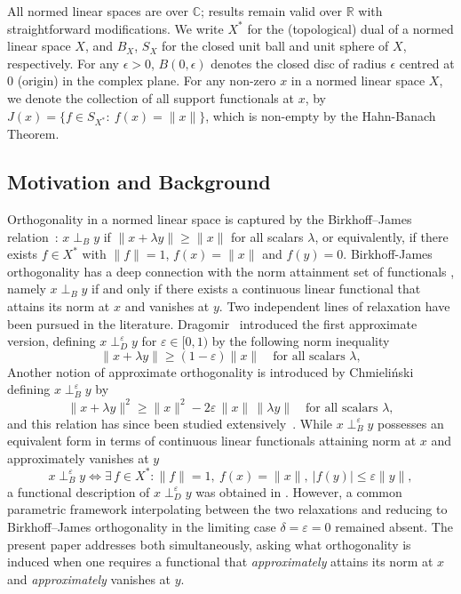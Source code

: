 \documentclass[11pt, reqno]{amsart}
\theoremstyle{definition}
\begin{document}
\noindent All normed linear spaces are over $\mathbb{C}$; results remain valid over 
$\mathbb{R}$ with straightforward modifications. We write $X^*$ for the (topological) dual of a normed linear space $X$, and $B_X$, $S_X$ for the closed unit ball and unit sphere of $X$, respectively. For any $\epsilon > 0$, $B(0, \epsilon)$ denotes the closed disc of radius $\epsilon$ centred at $0$ (origin) in the complex plane. For any non-zero $x$ in a normed linear space $X$, we denote the collection of all support functionals at $x$, by $J(x)=\{f\in S_{X^*}:~f(x)=\|x\|\}$, which is non-empty by the Hahn-Banach Theorem.

\subsection{Motivation and Background}

\noindent Orthogonality in a normed linear space is captured by the Birkhoff--James 
relation~\cite{Bir}: $x \perp_B y$ if $\|x + \lambda y\| \geq \|x\|$ 
for all scalars $\lambda$, or equivalently, if there exists $f \in X^*$ with 
$\|f\| = 1$, $f(x) = \|x\|$ and $f(y) = 0$. Birkhoff-James orthogonality has a deep connection with the norm attainment set of functionals \cite{Jam1, Jam2, roy}, namely $x\perp_B y$ if and only if there exists a continuous linear functional that attains 
its norm at $x$ and vanishes at $y$. Two independent lines of 
relaxation have been pursued in the literature. Dragomir~\cite{Drag} introduced 
the first approximate version, defining $x \perp^{\varepsilon}_{D} y$ for 
$\varepsilon \in [0,1)$ by the following norm inequality
\[
\|x + \lambda y\| \geq (1-\varepsilon)\|x\| \quad \text{for all scalars } \lambda,
\]
Another notion of approximate orthogonality is introduced by Chmieli\'nski~\cite{Chm1} defining $x \perp_B^\varepsilon y$ by
\[
\|x + \lambda y\|^2 \geq \|x\|^2 - 2\varepsilon\,\|x\|\,\|\lambda y\| 
\quad \text{for all scalars } \lambda,
\]
and this relation has since been studied 
extensively~\cite{Chm2, Chm3, Chm4, ChmGrWoj, ChmStWoj, ChmWoj, woj, Woj1, Pal, Alt}. 
While $x \perp_B^\varepsilon y$ possesses an equivalent form in terms of continuous linear functionals attaining norm at $x$ and approximately vanishes at $y$ \cite{ChmStWoj, woj} 
\[
x \perp_B^\varepsilon y \iff \exists\, f \in X^* : \|f\| = 1,\ 
f(x) = \|x\|,\ |f(y)| \leq \varepsilon\|y\|,
\]
a functional description of $x \perp^{\varepsilon}_{D} y$ was obtained in
\cite[Lemma 3.2]{MSP}. However, a common parametric framework interpolating between the two relaxations and reducing to Birkhoff--James orthogonality in the limiting case $\delta=\varepsilon=0$ remained absent. The present paper addresses both simultaneously, asking what orthogonality is induced when one requires a functional that 
\emph{approximately} attains its norm at $x$ and \emph{approximately} 
vanishes at $y$.
\end{document}
